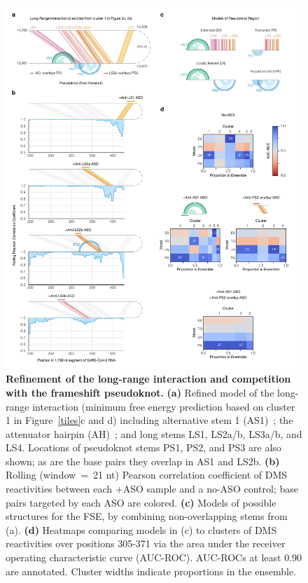 \documentclass[main.tex]{subfiles}
\begin{document}
\begin{figure}[H]
	\includegraphics[width=\textwidth]{../MainFigures/lnas/lnas.pdf}
	\caption{\textbf{Refinement of the long-range interaction and competition with the frameshift pseudoknot.} \textbf{(a)} Refined model of the long-range interaction (minimum free energy prediction based on cluster 1 in Figure~\ref{tiles}c and d) including alternative stem 1 (AS1)~\cite{Lan2022}; the attenuator hairpin (AH)~\cite{Su2005}; and long stems LS1, LS2a/b, LS3a/b, and LS4. Locations of pseudoknot stems PS1, PS2, and PS3 are also shown; as are the base pairs they overlap in AS1 and LS2b. \textbf{(b)} Rolling (window~=~21 nt) Pearson correlation coefficient of DMS reactivities between each +ASO sample and a no-ASO control; base pairs targeted by each ASO are colored. \textbf{(c)} Models of possible structures for the FSE, by combining non-overlapping stems from (a). \textbf{(d)} Heatmaps comparing models in (c) to clusters of DMS reactivities over positions 305-371 via the area under the receiver operating characteristic curve (AUC-ROC). AUC-ROCs at least 0.90 are annotated. Cluster widths indicate proportions in the ensemble.}
	\label{lnas}
\end{figure}
\end{document}
